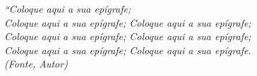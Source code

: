 \begin{epigrafe}
    \vspace*{\fill}
	\begin{flushright}
		\textit{``Coloque aqui a sua epígrafe; \\
		Coloque aqui a sua epígrafe; Coloque aqui a sua epígrafe;\\
		Coloque aqui a sua epígrafe; Coloque aqui a sua epígrafe;\\
		Coloque aqui a sua epígrafe; Coloque aqui a sua epígrafe.\\
		(Fonte, Autor)}
	\end{flushright}
\end{epigrafe}
